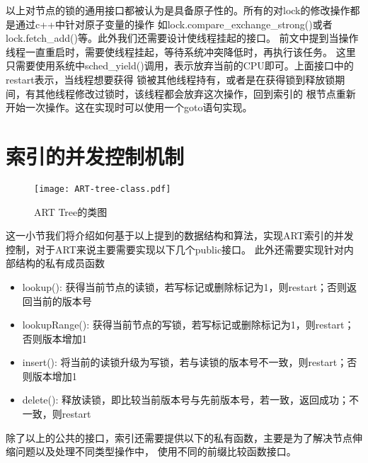 以上对节点的锁的通用接口都被认为是具备原子性的。所有的对lock的修改操作都是通过c++中针对原子变量的操作
如lock.compare\_exchange\_strong()或者lock.fetch\_add()等。此外我们还需要设计使线程挂起的接口。
前文中提到当操作线程一直重启时，需要使线程挂起，等待系统冲突降低时，再执行该任务。
这里只需要使用系统中sched\_yield()调用，表示放弃当前的CPU即可。上面接口中的restart表示，当线程想要获得
锁被其他线程持有，或者是在获得锁到释放锁期间，有其他线程修改过锁时，该线程都会放弃这次操作，回到索引的
根节点重新开始一次操作。这在实现时可以使用一个goto语句实现。

\section{索引的并发控制机制}

\begin{figure}[h]
  \centering
  \texttt{[image: ART-tree-class.pdf]}
  \caption{ART Tree的类图}
  \label{fig:ART-tree-class}
\end{figure}

这一小节我们将介绍如何基于以上提到的数据结构和算法，实现ART索引的并发控制，对于ART来说主要需要实现以下几个public接口。
此外还需要实现针对内部结构的私有成员函数

\begin{itemize}

\item lookup(): 获得当前节点的读锁，若写标记或删除标记为1，则restart；否则返回当前的版本号

\item lookupRange(): 获得当前节点的写锁，若写标记或删除标记为1，则restart；否则版本增加1

\item insert(): 将当前的读锁升级为写锁，若与读锁的版本号不一致，则restart；否则版本增加1

\item delete(): 释放读锁，即比较当前版本号与先前版本号，若一致，返回成功；不一致，则restart

\end{itemize}

除了以上的公共的接口，索引还需要提供以下的私有函数，主要是为了解决节点伸缩问题以及处理不同类型操作中，
使用不同的前缀比较函数接口。


